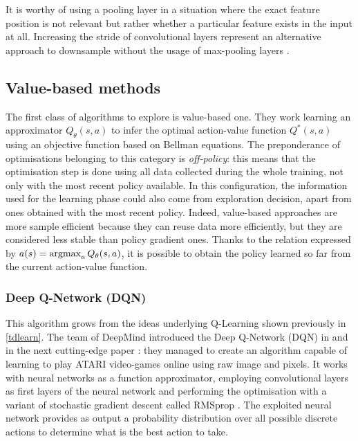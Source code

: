 It is worthy of using a pooling layer in a situation where the exact feature position is not relevant but rather whether a particular feature exists in the input at all.
Increasing the stride of convolutional layers represent an alternative approach to downsample without the usage of max-pooling layers \cite{springenberg2014striving}.

\subsection{Value-based methods}

The first class of algorithms to explore is value-based one.
They work learning an approximator $Q_\theta(s,a)$ to infer the optimal action-value function $Q^*(s,a)$ using an objective function based on Bellman equations.
The preponderance of optimisations belonging to this category is \textit{off-policy}: this means that the optimisation step is done using all data collected during the whole training, not only with the most recent policy available.
In this configuration, the information used for the learning phase could also come from exploration decision, apart from ones obtained with the most recent policy.
Indeed, value-based approaches are more sample efficient because they can reuse data more efficiently, but they are considered less stable than policy gradient ones.
Thanks to the relation expressed by $a(s) = \operatornamewithlimits{argmax}_a Q_\theta(s,a)$, it is possible to obtain the policy learned so far from the current action-value function.

\subsubsection{Deep Q-Network (DQN)}
This algorithm grows from the ideas underlying Q-Learning \cite{watkins1989learning}  shown previously in \vref{tdlearn}.
The team of DeepMind introduced the Deep Q-Network (DQN) in \cite{mnih2013playing} and in the next cutting-edge paper \cite{mnih2015human}: they managed to create an algorithm capable of learning to play ATARI video-games online using raw image and pixels.
It works with neural networks as a function approximator, employing convolutional layers as first layers of the neural network and performing the optimisation with a variant of stochastic gradient descent called RMSprop \cite{tieleman2012lecture}.
The exploited neural network provides as output a probability distribution over all possible discrete actions to determine what is the best action to take.


